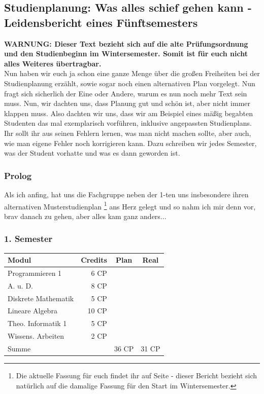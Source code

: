 \begin{multicols}{2}
\subsection{Studienplanung: Was alles schief gehen kann - Leidensbericht eines Fünftsemesters}
\label{studienplan_bericht}
  \textbf{WARNUNG: Dieser Text bezieht sich auf die alte
  Prüfungsordnung und den Studienbeginn im Wintersemester. Somit ist
  für euch nicht alles Weiteres übertragbar.}\\
Nun haben wir euch ja schon eine ganze Menge über die großen
Freiheiten bei der Studienplanung erzählt, sowie sogar noch einen
alternativen Plan vorgelegt. Nun fragt sich sicherlich der Eine oder
Andere, warum es nun noch mehr Text sein muss. Nun, wir dachten uns,
dass Planung gut und schön ist, aber nicht immer klappen muss. Also
dachten wir uns, dass wir am Beispiel eines mäßig begabten Studenten
das mal exemplarisch vorführen, inklusive angepassten
Studienplans. 
Ihr sollt ihr aus seinen Fehlern lernen, was man nicht machen sollte, aber
auch, wie man eigene Fehler noch korrigieren kann. Dazu schreiben wir
jedes Semester, was der Student vorhatte und was es dann geworden ist.
\subsubsection{Prolog}
Als ich anfing, hat uns die Fachgruppe neben der 1-ten uns
insbesondere ihren alternativen Musterstudienplan
\footnote{Die aktuelle Fassung für euch findet ihr auf Seite \pageref{studienplan_neu} - dieser Bericht bezieht sich natürlich 
auf die damalige Fassung für den Start im Wintersemester.}
ans Herz gelegt und
so nahm ich mir denn vor, brav danach zu gehen, aber alles kam ganz
anders...
\subsubsection*{1. Semester}

\newcommand{\nx}{\checkmark}

{
\footnotesize
\begin{tabular}{|l|r|c|c|}
\hline \textbf{Modul}		& \textbf{Credits} 	& \textbf{Plan} & \textbf{Real} \\ 
\hline
\hline Programmieren 1 		& 6 CP 				& \nx 			& \nx 	\\ 
\hline A. u. D.				& 8 CP 				& \nx 			& \nx 	\\ 
\hline Diskrete Mathematik 	& 5 CP 				& \nx 			& \nx 	\\ 
\hline Lineare Algebra 		& 10 CP 			& \nx 			& \nx 	\\ 
\hline Theo. Informatik 1	& 5 CP 				& \nx 			&  		\\ 
\hline Wissens. Arbeiten 	& 2 CP 				& \nx 			& \nx 	\\ 
\hline
\hline Summe 				&  					& 36 CP 		& 31 CP \\ 
\hline 
\end{tabular}
}


\end{multicols}
